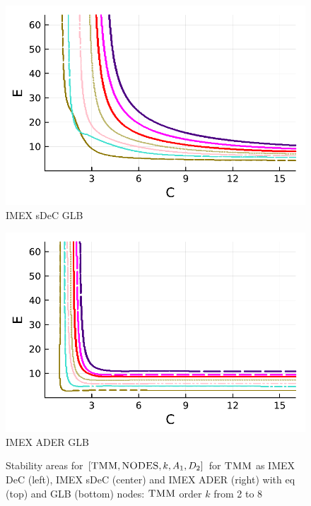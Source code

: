 \begin{figure}
\begin{minipage}[t]{0.32\textwidth}
		\includegraphics[width=\textwidth]{pdf/pdepics/diff/IMEXDeC_subtimesteps_gaussLobatto_TMM_ord_2-8.pdf}
		\centering
		IMEX sDeC GLB
	\end{minipage}
	\begin{minipage}[t]{0.32\textwidth}
		\includegraphics[width=\textwidth]{pdf/pdepics/diff/IMEXADER_gaussLobatto_TMM_ord_2-8.pdf}
		\centering
		IMEX ADER GLB
	\end{minipage} 
	\caption{Stability areas for $[\textsc{TMM},\textsc{NODES},k, A_1,D_2]$ for $\textsc{TMM}$ as IMEX DeC (left), IMEX sDeC (center) and IMEX ADER (right) with eq (top) and GLB (bottom) nodes: $\textsc{TMM}$ order $k$ from 2 to 8}
	\label{fig: grp_adv1_diff2}
\end{figure}

